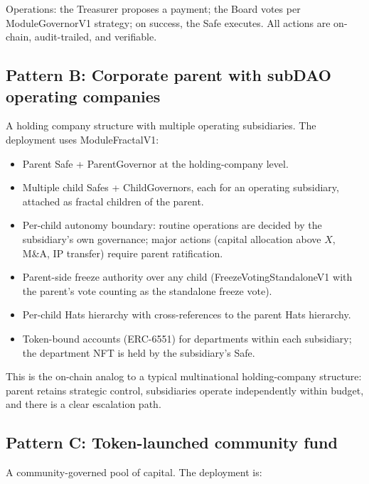 \documentclass[11pt,letterpaper]{article}
\begin{document}
Operations: the Treasurer proposes a payment; the Board votes per ModuleGovernorV1 strategy; on success, the Safe executes. All actions are on-chain, audit-trailed, and verifiable.

\subsection{Pattern B: Corporate parent with subDAO operating companies}

A holding company structure with multiple operating subsidiaries. The deployment uses ModuleFractalV1:

\begin{itemize}
\item Parent Safe + ParentGovernor at the holding-company level.
\item Multiple child Safes + ChildGovernors, each for an operating subsidiary, attached as fractal children of the parent.
\item Per-child autonomy boundary: routine operations are decided by the subsidiary's own governance; major actions (capital allocation above $X$, M\&A, IP transfer) require parent ratification.
\item Parent-side freeze authority over any child (FreezeVotingStandaloneV1 with the parent's vote counting as the standalone freeze vote).
\item Per-child Hats hierarchy with cross-references to the parent Hats hierarchy.
\item Token-bound accounts (ERC-6551) for departments within each subsidiary; the department NFT is held by the subsidiary's Safe.
\end{itemize}

This is the on-chain analog to a typical multinational holding-company structure: parent retains strategic control, subsidiaries operate independently within budget, and there is a clear escalation path.

\subsection{Pattern C: Token-launched community fund}

A community-governed pool of capital. The deployment is:
\end{document}
